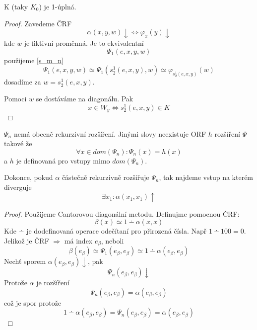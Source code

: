 \begin{theorem}[K 1-úplná]
	K (taky $K_0$) je 1-úplná.
\end{theorem}
\begin{proof}
	Zavedeme ČRF
	\[ \alpha(x, y, w) \downarrow \iff \varphi_x(y) \downarrow\]
	kde $w$ je fiktivní proměnná.
	Je to ekvivalentní
	\[ \Psi_1(e, x, y, w) \]
	použijeme \cref{s_m_n}
	\[ \Psi_1(e, x, y, w) \simeq \Psi_1(s_2^1(e, x, y), w) \simeq \varphi_{s_2^1(e, x, y)}(w) \]
	dosadíme za $w = s_2^1(e, x, y)$.

	Pomoci $w$ se dostáváme na diagonálu. Pak
	\[ x \in W_y \iff s_2^1(e, x, y) \in K \]
\end{proof}

\begin{theorem}
	$\Psi_n$ nemá obecně rekurzivní rozšíření.
	Jinými slovy neexistuje ORF $h$ rozšíření $\Psi$ takové že
	\[ \forall x \in dom(\Psi_n): \Psi_n(x) = h(x) \]
	a $h$ je definovaná pro vstupy mimo $dom(\Psi_n)$.

	Dokonce, pokud $\alpha$ částečně rekurzivně rozšiřuje $\Psi_n$, tak najdeme vstup na kterém diverguje
	\[ \exists x_1: \alpha(x_1, x_1) \uparrow \]
\end{theorem}
\begin{proof}
	Použijeme Cantorovou diagonální metodu.
	Definujme pomocnou ČRF:
	\[ \beta(x) \simeq 1 \dotminus \alpha(x, x) \]
	Kde $\dotminus$ je dodefinovaná operace odečítaní pro přirozená čísla.
	Např $1 \dotminus 100 = 0$.
	Jelikož je ČRF $\Rightarrow$ má index $e_{\beta}$, neboli
	\[ \beta(e_{\beta}) \simeq \Psi_1(e_{\beta}, e_{\beta}) \simeq 1 \dotminus \alpha(e_{\beta}, e_{\beta}) \]
	Nechť sporem $\alpha(e_{\beta}, e_{\beta}) \downarrow$, pak
	\[ \Psi_n(e_{\beta}, e_{\beta}) \downarrow \]
	Protože $\alpha$ je rozšíření
	\[ \Psi_n(e_{\beta}, e_{\beta}) = \alpha(e_{\beta}, e_{\beta})\]
	což je spor protože
	\[ 1 \dotminus \alpha(e_{\beta}, e_{\beta}) = \Psi_n(e_{\beta}, e_{\beta}) = \alpha(e_{\beta}, e_{\beta})\]
\end{proof}
